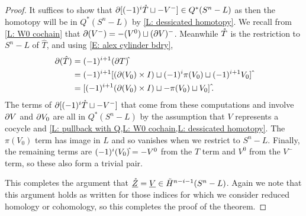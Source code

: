 \begin{proof}
	It suffices to show that $\partial[(-1)^i\mathring{T} \sqcup - V^-] \in Q^*(S^n-L)$ as then the homotopy will be in $Q^*(S^n-L)$ by \cref{L: dessicated homotopy}.
	We recall from \cref{L: W0 cochain} that $\partial(V^-) = -(V^0) \sqcup (\partial V)^-$.
	Meanwhile $\mathring{T}$ is the restriction to $S^n - L$ of $\hat T$, and using \eqref{E: alex cylinder bdry},
	\begin{align*}
		\bd (\hat T) &= (-1)^{i+1}(\bd T)\hat{\vrule height1.3ex width0pt}\\
		&=(-1)^{i+1}[(\bd (V_0) \times I) \sqcup (-1)^i\pi(V_0)\sqcup (-1)^{i+1} V_0]\,\hat{\vrule height1.3ex width0pt}\\
		&=[(-1)^{i+1}(\bd (V_0) \times I) \sqcup -\pi(V_0)\sqcup V_0]\,\hat{\vrule height1.3ex width0pt}.
	\end{align*}
	The terms of $\partial[ (-1)^i\mathring{T} \sqcup - V^-]$ that come from these computations and involve $\partial V$ and $\partial V_0$ are all in $Q^*(S^n-L)$ by the assumption that $V$ represents a cocycle and \cref{L: pullback with Q,L: W0 cochain,L: dessicated homotopy}.
	The $\pi(V_0)$ term has image in $L$ and so vanishes when we restrict to $S^n - L$.
	Finally, the remaining terms are $(-1)^i(V_0)\hat{\vrule height1.3ex width0pt} = -V^0$ from the $T$ term and $V^0$ from the $V^-$ term, so these also form a trivial pair.

	This completes the argument that $\underline{\mathring{Z}} = \underline{V} \in \tilde H^{n-i-1}(S^n - L)$.
	Again we note that this argument holds as written for those indices for which we consider reduced homology or cohomology, so this completes the proof of the theorem.
\end{proof}


